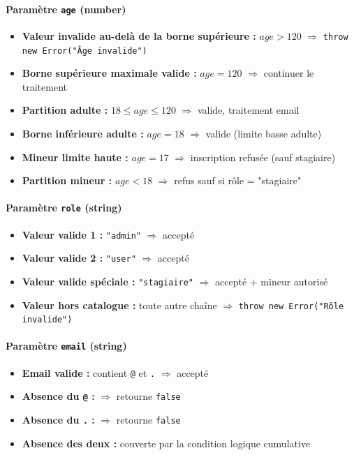 \documentclass[11pt,a4paper]{article}
\begin{document}
\paragraph{Paramètre \texttt{age} (number)}
\begin{itemize}
  \item \textbf{Valeur invalide au-delà de la borne supérieure :} $age > 120$
        $\Rightarrow$ \texttt{throw new Error("Âge invalide")}
  \item \textbf{Borne supérieure maximale valide :} $age = 120$ $\Rightarrow$ continuer le traitement
  \item \textbf{Partition adulte :} $18 \leq age \leq 120$ $\Rightarrow$ valide, traitement email
  \item \textbf{Borne inférieure adulte :} $age = 18$ $\Rightarrow$ valide (limite basse adulte)
  \item \textbf{Mineur limite haute :} $age = 17$ $\Rightarrow$ inscription refusée (sauf stagiaire)
  \item \textbf{Partition mineur :} $age < 18$ $\Rightarrow$ refus sauf si rôle = "stagiaire"
\end{itemize}

\paragraph{Paramètre \texttt{role} (string)}
\begin{itemize}
  \item \textbf{Valeur valide 1 :} \texttt{"admin"} $\Rightarrow$ accepté
  \item \textbf{Valeur valide 2 :} \texttt{"user"} $\Rightarrow$ accepté
  \item \textbf{Valeur valide spéciale :} \texttt{"stagiaire"} $\Rightarrow$ accepté + mineur autorisé
  \item \textbf{Valeur hors catalogue :} toute autre chaîne $\Rightarrow$ \texttt{throw new Error("Rôle invalide")}
\end{itemize}

\paragraph{Paramètre \texttt{email} (string)}
\begin{itemize}
  \item \textbf{Email valide :} contient \texttt{@} et \texttt{.} $\Rightarrow$ accepté
  \item \textbf{Absence du \texttt{@} :} $\Rightarrow$ retourne \texttt{false}
  \item \textbf{Absence du \texttt{.} :} $\Rightarrow$ retourne \texttt{false}
  \item \textbf{Absence des deux :} couverte par la condition logique cumulative
\end{itemize}
\end{document}
